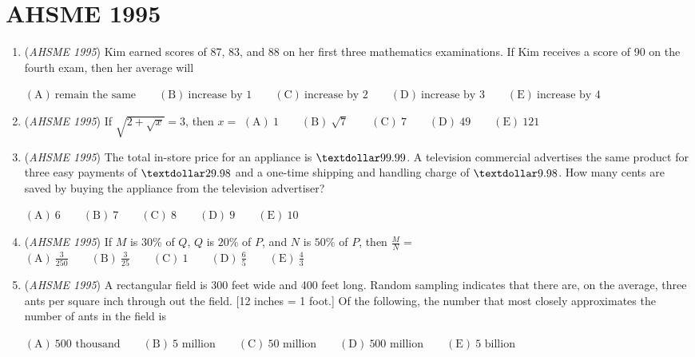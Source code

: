 \section{AHSME 1995}
        \begin{enumerate}
        	\item (\textit{AHSME 1995}) Kim earned scores of 87, 83, and 88 on her first three mathematics examinations. If Kim receives a score of 90 on the fourth exam, then her average will 


 $\mathrm{(A) \ \text{remain the same} } \qquad \mathrm{(B) \ \text{increase by 1} } \qquad \mathrm{(C) \ \text{increase by 2} } \qquad \mathrm{(D) \ \text{increase by 3} } \qquad \mathrm{(E) \ \text{increase by 4} }$


	\item (\textit{AHSME 1995}) If $\sqrt {2 + \sqrt {x}} = 3$, then $x =$
$\mathrm{(A) \ 1 } \qquad \mathrm{(B) \ \sqrt{7} } \qquad \mathrm{(C) \ 7 } \qquad \mathrm{(D) \ 49 } \qquad \mathrm{(E) \ 121 }$


	\item (\textit{AHSME 1995}) The total in-store price for an appliance is $\textdollar 99.99$. A television commercial advertises the same product for three easy payments of $\textdollar 29.98$ and a one-time shipping and handling charge of $\textdollar 9.98$. How many cents are saved by buying the appliance from the television advertiser?


 $\mathrm{(A) \ 6 } \qquad \mathrm{(B) \ 7 } \qquad \mathrm{(C) \ 8 } \qquad \mathrm{(D) \ 9 } \qquad \mathrm{(E) \ 10 }$


	\item (\textit{AHSME 1995}) If $M$ is $30 \%$ of $Q$, $Q$ is $20 \%$ of $P$, and $N$ is $50 \%$ of $P$, then $\frac {M}{N} =$
$\mathrm{(A) \ \frac {3}{250} } \qquad \mathrm{(B) \ \frac {3}{25} } \qquad \mathrm{(C) \ 1 } \qquad \mathrm{(D) \ \frac {6}{5} } \qquad \mathrm{(E) \ \frac {4}{3} }$


	\item (\textit{AHSME 1995}) A rectangular field is 300 feet wide and 400 feet long. Random sampling indicates that there are, on the average, three ants per square inch through out the field. [12 inches = 1 foot.] Of the following, the number that most closely approximates the number of ants in the field is 


 $\mathrm{(A) \ \text{500 thousand} } \qquad \mathrm{(B) \ \text{5 million} } \qquad \mathrm{(C) \ \text{50 million} } \qquad \mathrm{(D) \ \text{500 million} } \qquad \mathrm{(E) \ \text{5 billion} }$



\end{enumerate}

